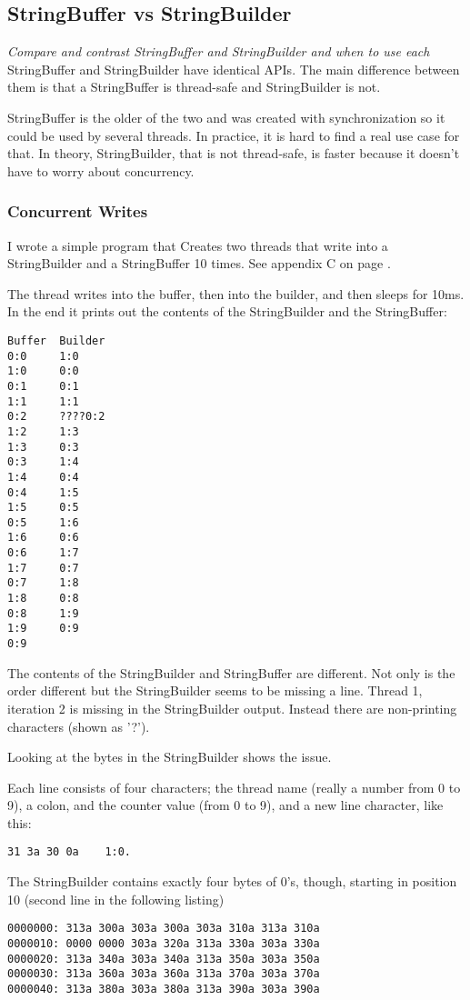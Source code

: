 \subsection{StringBuffer vs StringBuilder}
\textit{Compare and contrast StringBuffer and StringBuilder and when to use each}
StringBuffer and StringBuilder have identical APIs. The main difference between them is that a StringBuffer is thread-safe and StringBuilder is not.

StringBuffer is the older of the two and was created with synchronization so it could be used by several threads. In practice, it is hard to find a real use case for that. In theory, StringBuilder, that is not thread-safe, is faster because it doesn't have to worry about concurrency.

\subsubsection{Concurrent Writes}
I wrote a simple program that Creates two threads that write into a StringBuilder and a StringBuffer 10 times. See appendix C on page \pageref{App:AppendixC}.

The thread writes into the buffer, then into the builder, and then sleeps for 10ms. In the end it prints out the contents of the StringBuilder and the StringBuffer:
\begin{lstlisting}
Buffer	Builder
0:0     1:0
1:0     0:0
0:1     0:1
1:1     1:1
0:2     ????0:2
1:2     1:3
1:3     0:3
0:3     1:4
1:4     0:4
0:4     1:5
1:5     0:5
0:5     1:6
1:6     0:6
0:6     1:7
1:7     0:7
0:7     1:8
1:8     0:8
0:8     1:9
1:9     0:9
0:9     
\end{lstlisting}

The contents of the StringBuilder and StringBuffer are different. Not only is the order different but the StringBuilder seems to be missing a line. Thread 1, iteration 2 is missing in the StringBuilder output. Instead there are non-printing characters (shown as '?').

Looking at the bytes in the StringBuilder shows the issue.

Each line consists of four characters; the thread name (really a number from 0 to 9), a colon, and the counter value (from 0 to 9), and a new line character, like this:
\begin{lstlisting}
31 3a 30 0a    1:0.
\end{lstlisting}
The StringBuilder contains exactly four bytes of 0's, though, starting in position 10 (second line in the following listing)
\begin{lstlisting}
0000000: 313a 300a 303a 300a 303a 310a 313a 310a
0000010: 0000 0000 303a 320a 313a 330a 303a 330a
0000020: 313a 340a 303a 340a 313a 350a 303a 350a
0000030: 313a 360a 303a 360a 313a 370a 303a 370a
0000040: 313a 380a 303a 380a 313a 390a 303a 390a
\end{lstlisting}


